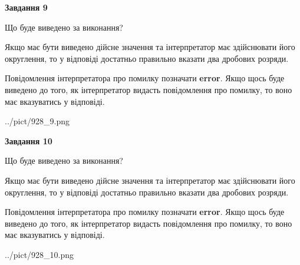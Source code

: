 \documentclass[12pt, ukrainian]{article}
\begin{document}
{\begin {Large}
{\begin {center}\textbf{Завдання 9}\end {center}}\par
Що буде виведено за виконання? \par

Якщо має бути виведено дійсне значення та інтерпретатор має здійснювати його округлення, 
то у відповіді достатньо правильно вказати два дробових розряди.

Повідомлення інтерпретатора про помилку позначати \textbf{error}.
Якщо щось буде виведено до того, як інтерпретатор видасть повідомлення про помилку, 
то воно має вказуватись у відповіді. \par

\begin{center}
	{../pict/928_9.png}
\end{center}
\newpage

{\begin {center}\textbf{Завдання 10}\end {center}}\par
Що буде виведено за виконання? \par

Якщо має бути виведено дійсне значення та інтерпретатор має здійснювати його округлення, 
то у відповіді достатньо правильно вказати два дробових розряди.

Повідомлення інтерпретатора про помилку позначати \textbf{error}.
Якщо щось буде виведено до того, як інтерпретатор видасть повідомлення про помилку, 
то воно має вказуватись у відповіді. \par

\begin{center}
	{../pict/928_10.png}
\end{center}
\newpage

\end {Large}}
\end{document}
